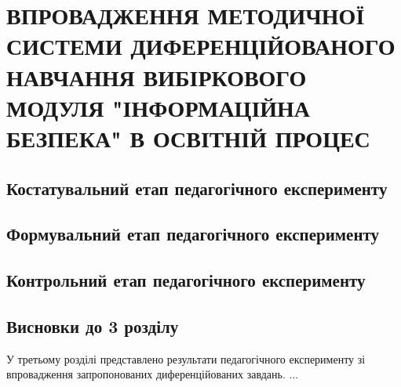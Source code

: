 \section{\MakeUppercase{ВПРОВАДЖЕННЯ МЕТОДИЧНОЇ СИСТЕМИ ДИФЕРЕНЦІЙОВАНОГО НАВЧАННЯ ВИБІРКОВОГО МОДУЛЯ "ІНФОРМАЦІЙНА БЕЗПЕКА" в освітній процес
}}

\subsection{Костатувальний етап педагогічного експерименту}
\subsection{Формувальний етап педагогічного експерименту}
\subsection{Контрольний етап педагогічного експерименту}
\subsection*{Висновки до 3 розділу}
У третьому розділі представлено результати педагогічного експерименту зі впровадження запропонованих диференційованих завдань. ... 
